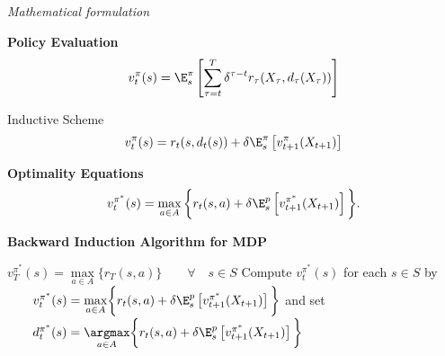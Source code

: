 \begin{frame}\begin{center}
		\LARGE\textit{Mathematical formulation}
\end{center}\end{frame}
\begin{frame}
\textbf{Policy Evaluation}\vspace{0.3cm}
\begin{align*}
v^\pi_t(s) = \E^\pi_{s}\left[ \sum^T_{\tau=t} \delta^{\tau - t}   r_\tau(X_\tau, d_\tau(X_\tau)) \right]\\
\end{align*}

Inductive Scheme
\begin{align*}
v^\pi_t(s) = r_t(s, d_t(s)) + \delta\E^\pi_{s} \left[v^\pi_{t + 1}(X_{t + 1})\right]
\end{align*}
\end{frame}
\begin{frame}
\textbf{Optimality Equations}\vspace{0.3cm}
\begin{align*}\label{MPD Optimality}
v^{\pi^*}_t(s) = \max_{a \in A}\bigg\{ r_t(s, a) + \delta \E^p_{s} \left[v^{\pi^*}_{t + 1}(X_{t + 1})\right] \bigg\}.
\end{align*}
\end{frame}
\begin{frame}
\textbf{Backward Induction Algorithm for MDP}\vspace{0.5cm}

\begin{algorithmic}\small
{}
        \State $v^{\pi^*}_T(s) = \underset{a \in A}{\max}\bigg\{ r_T(s, a) \bigg\}\qquad \forall\quad s\in S$
    \Else
        \State Compute $v^{\pi^*}_t(s)$ for each $s\in S$ by
        \State $\qquad v^{\pi^*}_t(s) = \underset{a \in A}{\max}\bigg\{ r_t(s, a) + \delta\E^p_{s} \left[v^{\pi^*}_{t + 1}(X_{t + 1})\right] \bigg\}$
        \State and set
        \State $\qquad d^{\pi^*}_t(s) = \underset{a \in A}{\argmax}\bigg\{ r_t(s, a) + \delta\E^p_{s} \left[v^{\pi^*}_{t + 1}(X_{t + 1})\right] \bigg\}$
    \EndIf
\EndFor
\end{algorithmic}
\end{frame}
